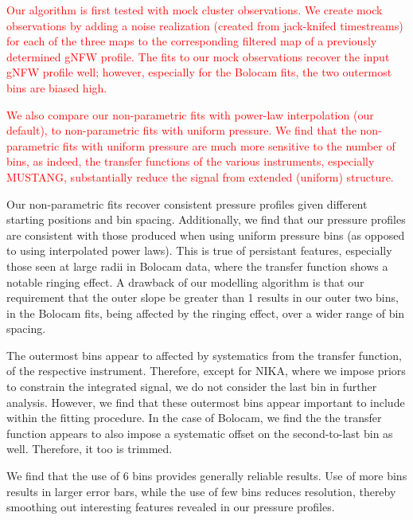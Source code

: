 \documentclass[twocolumn,traditabstract]{aa}
\begin{document}
\textcolor{red}{
  Our algorithm is first tested with mock cluster observations. We create mock observations by adding
  a noise realization (created from jack-knifed timestreams) for each of the three maps to the
  corresponding filtered map of a previously determined \citep{romero2017} gNFW profile. The fits to
  our mock observations recover the input gNFW profile well; however, especially for the Bolocam
  fits, the two outermost bins are biased high.}

\textcolor{red}{We also compare our non-parametric fits with power-law interpolation (our default),
  to non-parametric fits with uniform pressure. We find that the non-parametric fits with uniform
  pressure are much more sensitive to the number of bins, as indeed, the transfer functions of the
  various instruments, especially MUSTANG, substantially reduce the signal from extended (uniform)
  structure.}

Our non-parametric fits recover consistent pressure profiles given different starting positions and bin spacing.
Additionally, we find that our pressure profiles are consistent with those produced when using uniform pressure
bins (as opposed to using interpolated power laws). This is true of persistant features, especially those seen
at large radii in Bolocam data, where the transfer function shows a notable ringing effect. A drawback of our
modelling algorithm is that our requirement that the outer slope be greater than 1 results in our outer two bins,
in the Bolocam fits, being affected by the ringing effect, over a wider range of bin spacing. 

The outermost bins appear to affected by systematics from the transfer function, of the respective instrument.
Therefore, except for NIKA, where we impose priors to constrain the integrated signal, we do not consider the
last bin in further analysis. However, we find that these outermost bins appear important to include within the
fitting procedure. In the case of Bolocam, we find the the transfer function appears to also impose a systematic
offset on the second-to-last bin as well. Therefore, it too is trimmed.

We find that the use of 6 bins provides generally reliable results. Use of more bins results in larger error bars, while
the use of few bins reduces resolution, thereby smoothing out interesting features revealed in our pressure profiles.
\end{document}
